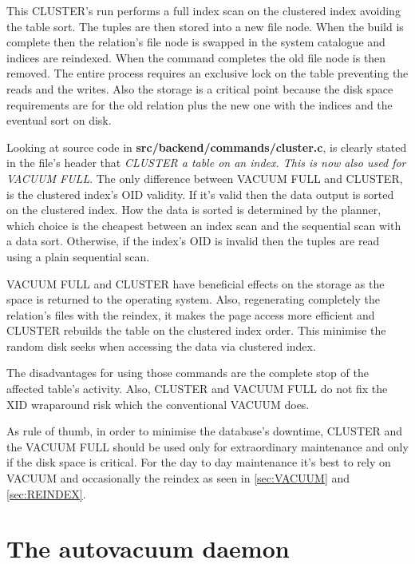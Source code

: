 This CLUSTER's run performs a full index scan on the clustered index avoiding the table sort. The 
tuples are then stored into a new file node. When the build is complete then the relation's file 
node is swapped in the system catalogue and indices are reindexed. When the command completes the 
old file node is then removed. The entire process requires an exclusive lock on the table preventing 
the reads and the writes. Also the storage is a critical point because the disk space 
requirements are for the old relation plus the new one with the indices and the eventual sort on 
disk.\newline

Looking at source code in \textbf{src/backend/commands/cluster.c}, is clearly stated in the 
file's header that \textit{CLUSTER a table on an index.  This is now also used for VACUUM FULL}. 
The only difference between VACUUM FULL and CLUSTER, is the clustered index's OID validity. If 
it's valid then the data output is sorted on the clustered index. How the data is sorted is 
determined by the planner, which choice is the cheapest between an index scan and the sequential 
scan with a data sort. Otherwise, if the index's OID is invalid then the tuples are read using a 
plain sequential scan.\newline

VACUUM FULL and CLUSTER have beneficial effects on the storage as the space is returned to the 
operating system. Also, regenerating completely the relation's files with the reindex, it makes the 
page access more efficient and CLUSTER rebuilds the table on the clustered index order. This 
minimise the random disk seeks when accessing the data via clustered index.\newline

The disadvantages for using those commands are the complete stop of the affected table's activity. 
Also, CLUSTER and VACUUM FULL do not fix the XID wraparound risk which the conventional VACUUM 
does.\newline

As rule of thumb, in order to minimise the database's downtime, CLUSTER and the VACUUM FULL should 
be used only for extraordinary maintenance and only if the disk space is critical. For the day to 
day maintenance it's best to rely on VACUUM and occasionally the reindex as seen in \ref{sec:VACUUM} 
and \ref{sec:REINDEX}.



\section{The autovacuum daemon}
\label{sec:AUTOVACUUM}